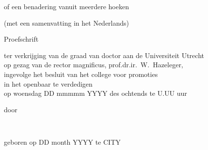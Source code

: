 \begin{titlepage}
\begin{center}
        {\Large\titlefont\titleshape of een benadering vanuit meerdere hoeken}

        (met een samenvatting in het Nederlands)

        \bigskip
        \bigskip

        
        {\Large\titlefont Proefschrift}

        \bigskip
        \bigskip


        ter verkrijging van de graad van doctor aan de Universiteit Utrecht\\[\medskipamount]
        op gezag van de rector magnificus, prof.dr.ir.\ W.~Hazeleger,\\[\medskipamount]
        ingevolge het besluit van het college voor promoties\\[\medskipamount]
        in het openbaar te verdedigen\\[\medskipamount]
        op woensdag DD mmmmm YYYY  des ochtends te U.UU uur

        \bigskip
        \bigskip

        door

        \bigskip
        \bigskip



        {\makeatletter
        \Large\titlefont\bfseries\@firstname~\@middlename~{\titleshape\@lastname}
        \makeatother}



        \bigskip
        \bigskip



        geboren op DD month YYYY te CITY



\end{center}
\end{titlepage}
